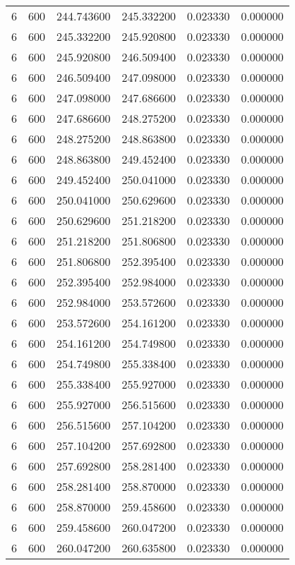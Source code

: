 \begin{longtable}{rrrrrr}
6 & 600 & 244.743600 & 245.332200 & 0.023330 & 0.000000 \\
6 & 600 & 245.332200 & 245.920800 & 0.023330 & 0.000000 \\
6 & 600 & 245.920800 & 246.509400 & 0.023330 & 0.000000 \\
6 & 600 & 246.509400 & 247.098000 & 0.023330 & 0.000000 \\
6 & 600 & 247.098000 & 247.686600 & 0.023330 & 0.000000 \\
6 & 600 & 247.686600 & 248.275200 & 0.023330 & 0.000000 \\
6 & 600 & 248.275200 & 248.863800 & 0.023330 & 0.000000 \\
6 & 600 & 248.863800 & 249.452400 & 0.023330 & 0.000000 \\
6 & 600 & 249.452400 & 250.041000 & 0.023330 & 0.000000 \\
6 & 600 & 250.041000 & 250.629600 & 0.023330 & 0.000000 \\
6 & 600 & 250.629600 & 251.218200 & 0.023330 & 0.000000 \\
6 & 600 & 251.218200 & 251.806800 & 0.023330 & 0.000000 \\
6 & 600 & 251.806800 & 252.395400 & 0.023330 & 0.000000 \\
6 & 600 & 252.395400 & 252.984000 & 0.023330 & 0.000000 \\
6 & 600 & 252.984000 & 253.572600 & 0.023330 & 0.000000 \\
6 & 600 & 253.572600 & 254.161200 & 0.023330 & 0.000000 \\
6 & 600 & 254.161200 & 254.749800 & 0.023330 & 0.000000 \\
6 & 600 & 254.749800 & 255.338400 & 0.023330 & 0.000000 \\
6 & 600 & 255.338400 & 255.927000 & 0.023330 & 0.000000 \\
6 & 600 & 255.927000 & 256.515600 & 0.023330 & 0.000000 \\
6 & 600 & 256.515600 & 257.104200 & 0.023330 & 0.000000 \\
6 & 600 & 257.104200 & 257.692800 & 0.023330 & 0.000000 \\
6 & 600 & 257.692800 & 258.281400 & 0.023330 & 0.000000 \\
6 & 600 & 258.281400 & 258.870000 & 0.023330 & 0.000000 \\
6 & 600 & 258.870000 & 259.458600 & 0.023330 & 0.000000 \\
6 & 600 & 259.458600 & 260.047200 & 0.023330 & 0.000000 \\
6 & 600 & 260.047200 & 260.635800 & 0.023330 & 0.000000 \\

\end{longtable}
